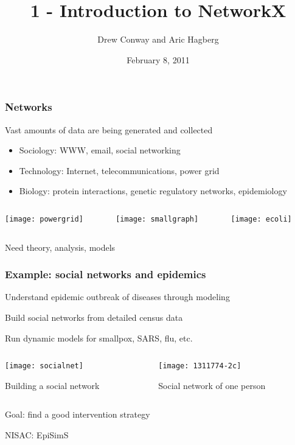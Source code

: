 \documentclass[xcolor=dvipsnames, 9pt]{beamer}
\title{1 - Introduction to NetworkX}
\author{Drew Conway and Aric Hagberg}
\date{February 8, 2011}
\begin{document}
\begin{frame}[plain]
\titlepage
\end{frame}

\begin{frame}
\frametitle{Networks}

Vast amounts of data are being generated and collected

\begin{itemize}
\item Sociology: WWW, email, social networking  
\item Technology: Internet, telecommunications, power grid
\item Biology: protein interactions, genetic regulatory networks, epidemiology
\end{itemize}

\begin{columns}[c]
\begin{column}{0.33\textwidth}
\centerline{\texttt{[image: powergrid]}}
\end{column}
\begin{column}{0.33\textwidth}
\centerline{\texttt{[image: smallgraph]}}
\end{column}
\begin{column}{0.33\textwidth}
\centerline{\texttt{[image: ecoli]}}
\end{column}
\end{columns}

\bigskip
Need theory, analysis, models 

\end{frame}

\begin{frame}
\frametitle{Example: social networks and epidemics}
Understand epidemic outbreak of diseases through modeling

Build social networks from detailed census data 

Run dynamic models for smallpox, SARS, flu, etc. 

\begin{columns}[c]
\begin{column}{0.65\textwidth}
\centerline{\texttt{[image: socialnet]}}
\centerline{\small Building a social network}
\end{column}
\begin{column}{0.35\textwidth}

\centerline{\texttt{[image: 1311774-2c]}}
\centerline{\small Social network of one person}
\end{column}
\end{columns}

Goal: find a good intervention strategy

\footnotesize
NISAC: EpiSimS
\end{frame}
\end{document}
